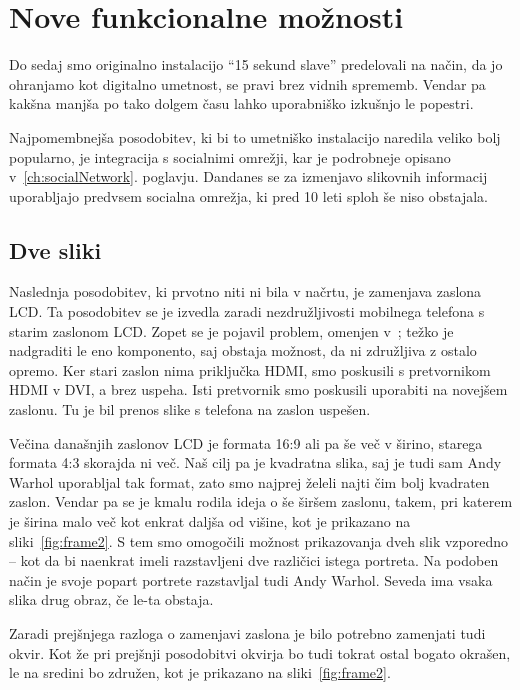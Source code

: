 \documentclass[a4paper, 12pt]{book}
\begin{document}
\chapter{Nove funkcionalne možnosti}
\label{ch:novosti}
Do sedaj smo originalno instalacijo ``15 sekund slave'' predelovali na način,
da jo ohranjamo kot digitalno umetnost, se pravi brez vidnih sprememb. Vendar
pa kakšna manjša po tako dolgem času lahko uporabniško izkušnjo le popestri.

Najpomembnejša posodobitev, ki bi to umetniško instalacijo naredila veliko
bolj popularno, je integracija s socialnimi omrežji, kar je podrobneje opisano
v~\ref{ch:socialNetwork}. poglavju. Dandanes se za izmenjavo slikovnih
informacij uporabljajo predvsem socialna omrežja, ki pred 10 leti sploh še
niso obstajala.


\section{Dve sliki}
Naslednja posodobitev, ki prvotno niti ni bila v načrtu, je zamenjava zaslona
LCD. Ta posodobitev se je izvedla zaradi nezdružljivosti mobilnega telefona
s starim zaslonom LCD. Zopet se je pojavil problem, omenjen
v~; težko je nadgraditi le eno
komponento, saj obstaja možnost, da ni združljiva z ostalo opremo. Ker stari
zaslon nima priključka HDMI, smo poskusili s pretvornikom HDMI v DVI, a brez
uspeha. Isti pretvornik smo poskusili uporabiti na novejšem zaslonu. Tu je bil
prenos slike s telefona na zaslon uspešen.

Večina današnjih zaslonov LCD je formata 16:9 ali pa še več v širino, starega
formata 4:3 skorajda ni več. Naš cilj pa je kvadratna slika, saj je tudi sam
Andy Warhol uporabljal tak format, zato smo najprej želeli najti čim bolj
kvadraten zaslon. Vendar pa se je kmalu rodila ideja o še širšem zaslonu,
takem, pri katerem je širina malo več kot enkrat daljša od višine, kot je
prikazano na sliki~\ref{fig:frame2}. S tem smo omogočili možnost prikazovanja
dveh slik vzporedno -- kot da bi naenkrat imeli razstavljeni dve različici
istega portreta. Na podoben način je svoje popart portrete razstavljal tudi
Andy Warhol. Seveda ima vsaka slika drug obraz, če le-ta obstaja.

Zaradi prejšnjega razloga o zamenjavi zaslona je bilo potrebno zamenjati tudi
okvir. Kot že pri prejšnji posodobitvi okvirja bo tudi tokrat ostal bogato
okrašen, le na sredini bo združen, kot je prikazano na sliki~\ref{fig:frame2}.
\end{document}
